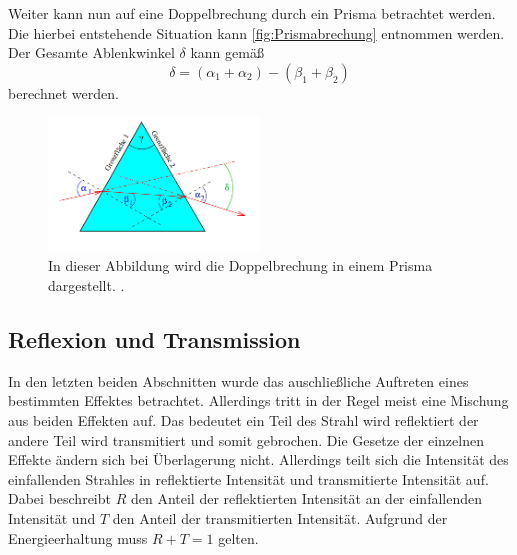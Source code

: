 Weiter kann nun auf eine Doppelbrechung durch ein Prisma betrachtet werden. Die hierbei entstehende Situation kann \autoref{fig:Prismabrechung} entnommen werden.
Der Gesamte Ablenkwinkel $\delta$ kann gemäß 
\begin{equation}
  \label{eqn:delta}
  \delta = (\alpha_1 + \alpha_2) - (\beta_1 + \beta_2)
\end{equation}
berechnet werden.

\begin{figure}
  \centering
  \includegraphics[width=0.5\textwidth]{content/Prismabrechung.png}
  \caption{In dieser Abbildung wird die Doppelbrechung in einem Prisma dargestellt. \cite{v400}.}
  \label{fig:Prismabrechung}
\end{figure}

\subsection{Reflexion und Transmission}
\label{subsec:ReUTra}
In den letzten beiden Abschnitten wurde das auschließliche Auftreten eines bestimmten Effektes betrachtet. Allerdings tritt in der Regel meist eine Mischung aus beiden Effekten
auf. Das bedeutet ein Teil des Strahl wird reflektiert der andere Teil wird transmitiert und somit gebrochen. Die Gesetze der einzelnen Effekte ändern sich bei Überlagerung
nicht. Allerdings teilt sich die Intensität des einfallenden Strahles in reflektierte Intensität und transmitierte Intensität auf. Dabei beschreibt $R$ den Anteil der 
reflektierten Intensität an der einfallenden Intensität und $T$ den Anteil der transmitierten Intensität. Aufgrund der Energieerhaltung muss $R + T = 1$ gelten.

